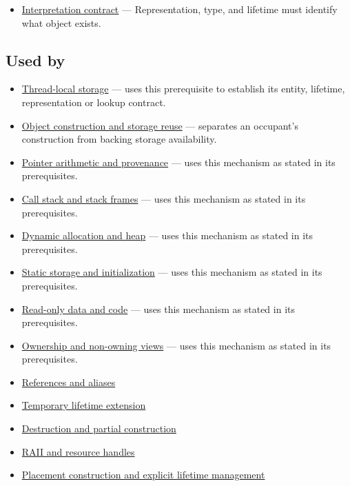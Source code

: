 \begin{itemize}
\tightlist
\item
  \hyperref[appendix-f414bd4ed05c]{Interpretation contract} --- Representation, type, and lifetime must identify what object exists.
\end{itemize}

\subsection{Used by}\label{appendix-0b104bcba06b-used-by}

\begin{itemize}
\tightlist
\item
  \hyperref[appendix-3b88c6cd7195]{Thread-local storage} --- uses this prerequisite to establish its entity, lifetime, representation or lookup contract.
\item
  \hyperref[appendix-a82f9c438857]{Object construction and storage reuse} --- separates an occupant's construction from backing storage availability.
\item
  \hyperref[appendix-6af5921bc853]{Pointer arithmetic and provenance} --- uses this mechanism as stated in its prerequisites.
\item
  \hyperref[appendix-b081b7abe193]{Call stack and stack frames} --- uses this mechanism as stated in its prerequisites.
\item
  \hyperref[appendix-c3480f7d9ff3]{Dynamic allocation and heap} --- uses this mechanism as stated in its prerequisites.
\item
  \hyperref[appendix-17c93c4c2f19]{Static storage and initialization} --- uses this mechanism as stated in its prerequisites.
\item
  \hyperref[appendix-5f9e5e2f0a5e]{Read-only data and code} --- uses this mechanism as stated in its prerequisites.
\item
  \hyperref[appendix-d52e4486f527]{Ownership and non-owning views} --- uses this mechanism as stated in its prerequisites.
\item
  \hyperref[appendix-d6d562ca9fbb]{References and aliases}
\item
  \hyperref[appendix-a978b29bbbb0]{Temporary lifetime extension}
\item
  \hyperref[appendix-9bfe377cef7a]{Destruction and partial construction}
\item
  \hyperref[appendix-69739d3ab49b]{RAII and resource handles}
\item
  \hyperref[appendix-f56c3e43fd4e]{Placement construction and explicit lifetime management}
\end{itemize}

